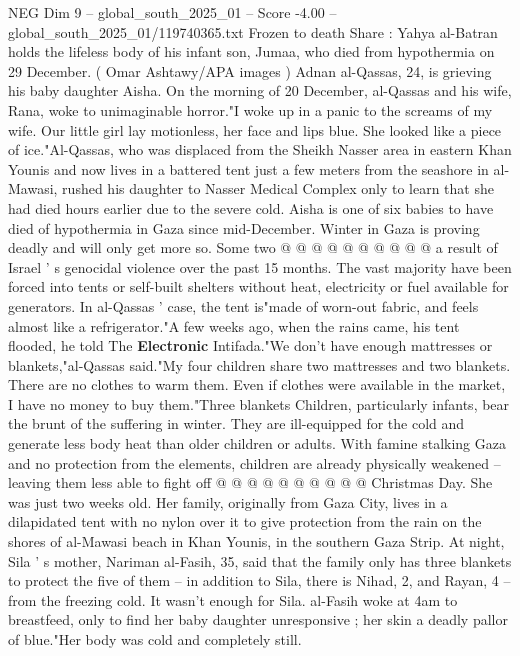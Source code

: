 \begin{textsample}{NEG Dim 9 – global\_south\_2025\_01 – Score -4.00 – global\_south\_2025\_01/119740365.txt}  \label{ex:f9_neg_108}
Frozen to death Share : Yahya al-Batran holds the lifeless body of his infant son, Jumaa, who died from hypothermia on 29 December. ( Omar Ashtawy/APA images ) Adnan al-Qassas, 24, is grieving his baby daughter Aisha.
On the morning of 20 December, al-Qassas and his wife, Rana, woke to unimaginable horror."I woke up in a panic to the screams of my wife.
Our little girl lay motionless, her face and lips blue.
She looked like a piece of ice."Al-Qassas, who was displaced from the Sheikh Nasser area in eastern Khan Younis and now lives in a battered tent just a few meters from the seashore in al-Mawasi, rushed his daughter to Nasser Medical Complex only to learn that she had died hours earlier due to the severe cold.
Aisha is one of six babies to have died of hypothermia in Gaza since mid-December.
Winter in Gaza is proving deadly and will only get more so.
Some two @ @ @ @ @ @ @ @ @ @ a result of Israel ' s genocidal violence over the past 15 months.
The vast majority have been forced into tents or self-built shelters without heat, electricity or fuel available for generators.
In al-Qassas ' case, the tent is"made of worn-out fabric, and feels almost like a refrigerator."A few weeks ago, when the rains came, his tent flooded, he told The \textbf{Electronic} Intifada."We don't have enough mattresses or blankets,"al-Qassas said."My four children share two mattresses and two blankets.
There are no clothes to warm them.
Even if clothes were available in the market, I have no money to buy them."Three blankets Children, particularly infants, bear the brunt of the suffering in winter.
They are ill-equipped for the cold and generate less body heat than older children or adults.
With famine stalking Gaza and no protection from the elements, children are already physically weakened -- leaving them less able to fight off @ @ @ @ @ @ @ @ @ @ Christmas Day.
She was just two weeks old.
Her family, originally from Gaza City, lives in a dilapidated tent with no nylon over it to give protection from the rain on the shores of al-Mawasi beach in Khan Younis, in the southern Gaza Strip.
At night, Sila ' s mother, Nariman al-Fasih, 35, said that the family only has three blankets to protect the five of them -- in addition to Sila, there is Nihad, 2, and Rayan, 4 -- from the freezing cold.
It wasn't enough for Sila. al-Fasih woke at 4am to breastfeed, only to find her baby daughter unresponsive ; her skin a deadly pallor of blue."Her body was cold and completely still.

\end{textsample}
